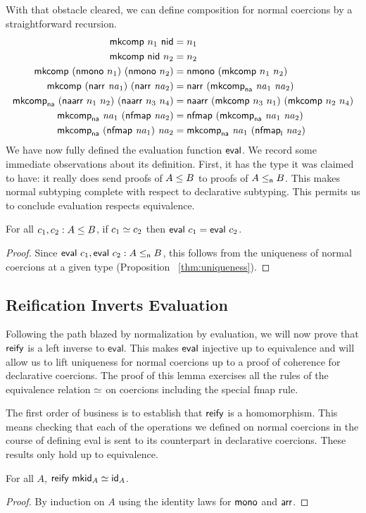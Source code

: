 \documentclass[acmsmall,screen]{acmart}
\begin{document}
With that obstacle cleared, we can define composition for normal coercions by a
straightforward recursion.
\begin{align*}
  \mkcomp\ n_1\ \nid &= n_1 \\
  \mkcomp\ \nid\ n_2 &= n_2\\
  \mkcomp\ (\nmono\ n_1)\ (\nmono\ n_2) &= \nmono\ (\mkcomp\ n_1\ n_2) \\
  \mkcomp\ (\narr\ \na_1)\ (\narr\ \na_2) &= \narr\ (\mkcompna\ \na_1\ \na_2) \\
  \mkcompna\ (\naarr\ n_1\ n_2)\ (\naarr\ n_3\ n_4) &= \naarr\ (\mkcomp\ n_3\ n_1)\ (\mkcomp\ n_2\ n_4) \\
  \mkcompna\  \na_1\ (\nfmap{\na_2})&= \nfmap{(\mkcompna\ \na_1\ \na_2)} \\
  \mkcompna\ (\nfmap{\na_1})\ \na_2 &= \mkcompna\ \na_1\ (\nfmapl\ \na_2)
\end{align*}
We have now fully defined the evaluation function \(\mathsf{eval}\).
We record some immediate observations about its definition.  First, it has the
type it was claimed to have: it really does send proofs of \(A \leq B\) to
proofs of \(A \leq_{\mathsf{n}} B\). This makes normal subtyping complete with respect to
declarative subtyping. This permits us to conclude evaluation respects equivalence.
\begin{proposition}
  For all \(c_1, c_2 : A \leq B\),
  if \(c_1 \simeq c_2\) then \(\mathsf{eval}\ c_1 = \mathsf{eval}\ c_2\).
\end{proposition}
\begin{proof}
  Since \(\mathsf{eval}\ c_1, \mathsf{eval}\ c_2 : A \leq_{\mathsf{n}} B\), this follows from the
  uniqueness of normal coercions at a given type (Proposition ~\ref{thm:uniqueness}).
\end{proof}

\subsection{Reification Inverts Evaluation}
Following the path blazed by normalization by evaluation, we will now prove that
\(\mathsf{reify}\) is a left inverse to \(\mathsf{eval}\). This makes \(\mathsf{eval}\)
injective up to equivalence and will allow us to lift uniqueness for normal
coercions up to a proof of coherence for declarative coercions.  The proof of
this lemma exercises all the rules of the equivalence relation \(\simeq\) on
coercions including the special fmap rule.

The first order of business is to establish that \(\mathsf{reify}\) is a homomorphism.
This means checking that each of the operations we defined on normal coercions
in the course of defining eval is sent to its counterpart in declarative
coercions. These results only hold up to equivalence.
\begin{proposition}\label{reify-mkid}
  For all \(A\), \(\mathsf{reify}\ \mathsf{mkid}_{A} \simeq \mathsf{id}_{A}\).
\end{proposition}
\begin{proof}
  By induction on \(A\) using the identity laws for \(\mathsf{mono}\) and \(\mathsf{arr}\).
\end{proof}
\end{document}
